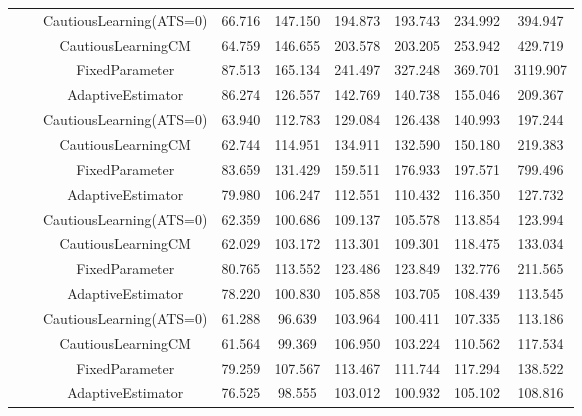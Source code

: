\begin{table}[!h]
\begin{tabular}[t]{ccccccccc}
 &  & CautiousLearning(ATS=0) & 66.716 & 147.150 & 194.873 & 193.743 & 234.992 & 394.947\\

 &  & CautiousLearningCM & 64.759 & 146.655 & 203.578 & 203.205 & 253.942 & 429.719\\

 & \multirow[t]{-4}{*}{\centering\arraybackslash 0.35} & FixedParameter & 87.513 & 165.134 & 241.497 & 327.248 & 369.701 & 3119.907\\
\cmidrule{2-9}
 &  & AdaptiveEstimator & 86.274 & 126.557 & 142.769 & 140.738 & 155.046 & 209.367\\

 &  & CautiousLearning(ATS=0) & 63.940 & 112.783 & 129.084 & 126.438 & 140.993 & 197.244\\

 &  & CautiousLearningCM & 62.744 & 114.951 & 134.911 & 132.590 & 150.180 & 219.383\\

 & \multirow[t]{-4}{*}{\centering\arraybackslash 0.50} & FixedParameter & 83.659 & 131.429 & 159.511 & 176.933 & 197.571 & 799.496\\
\cmidrule{2-9}
 &  & AdaptiveEstimator & 79.980 & 106.247 & 112.551 & 110.432 & 116.350 & 127.732\\

 &  & CautiousLearning(ATS=0) & 62.359 & 100.686 & 109.137 & 105.578 & 113.854 & 123.994\\

 &  & CautiousLearningCM & 62.029 & 103.172 & 113.301 & 109.301 & 118.475 & 133.034\\

 & \multirow[t]{-4}{*}{\centering\arraybackslash 0.75} & FixedParameter & 80.765 & 113.552 & 123.486 & 123.849 & 132.776 & 211.565\\
\cmidrule{2-9}
 &  & AdaptiveEstimator & 78.220 & 100.830 & 105.858 & 103.705 & 108.439 & 113.545\\

 &  & CautiousLearning(ATS=0) & 61.288 & 96.639 & 103.964 & 100.411 & 107.335 & 113.186\\

 &  & CautiousLearningCM & 61.564 & 99.369 & 106.950 & 103.224 & 110.562 & 117.534\\

 & \multirow[t]{-4}{*}{\centering\arraybackslash 1.00} & FixedParameter & 79.259 & 107.567 & 113.467 & 111.744 & 117.294 & 138.522\\
\cmidrule{2-9}
 &  & AdaptiveEstimator & 76.525 & 98.555 & 103.012 & 100.932 & 105.102 & 108.816\\


\end{tabular}
\end{table}
